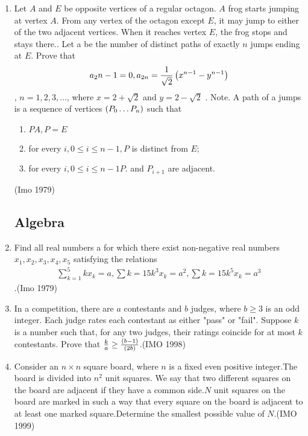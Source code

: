 \begin{enumerate}
	\item Let $A$ and $E$ be opposite vertices of a regular octagon. $A$ frog starts jumping at vertex $A$. From any vertex of the octagon except $E$, it may jump to either of the two adjacent vertices. When it reaches vertex $E$, the frog stops and stays there.. Let a be the number of distinct paths of exactly $n$ jumps ending at $E$. Prove that 
\begin{align}a_2n-1=0, a_{2n} = \frac{1}{\sqrt{2}}\left(x^{n - 1} - y^{n - 1}\right)\end{align},
$n = 1, 2, 3 ,\ldots$,
	where $x = 2 + \sqrt{2}$ and $y = 2 - \sqrt{2}$ . Note. A path of a jumps is a sequence of vertices $\left(P_0\ldots P_n\right)$ such that
\begin{enumerate}
	\item $PA, P = E$
\item for every $i, 0 \leq i \leq n - 1, P$ is distinct from $E$;
\item for every $i, 0 \leq i \leq n - 1 P$. and $P_{i+1}$ are adjacent.\end{enumerate}\hfill(Imo 1979)
	\subsection*{ Algebra}  
\item Find all real numbers a for which there exist non-negative real numbers $x_1, x_2, x_3, x_4,x_5$ satisfying the relations \begin{align}\sum_{k=1}^{5}kx_{k}=a,\sum{k=1}{5}k^{3}x_{k}=a^2,\sum{k=1}{5}k^{5}x_{k}=a^3\end{align}.\hfill(Imo 1979)
\item In a competition, there are $a$ contestants and $b$ judges, where $ b \geq 3$ is an odd integer. Each judge rates each contestant as either "pass" or "fail". Suppose $k$ is a number such that, for any two judges, their ratings coincide for at most $k$ contestants. Prove that $ \frac{k}{a} \geq \frac{\left(b-1\right)}{\left(2b\right)}$.\hfill(IMO 1998)                                                      
	
\item Consider an $n \times n$ square board, where $n$ is a fixed even positive integer.The board is divided into $n^2$ unit squares. We say that two different squares on the board are adjacent if they have a common side.$N$ unit squares on the board are marked in such a way that every square  on the board is adjacent to at least one marked square.Determine the smallest possible value of $N$.\hfill(IMO 1999)
	

\end{enumerate}
